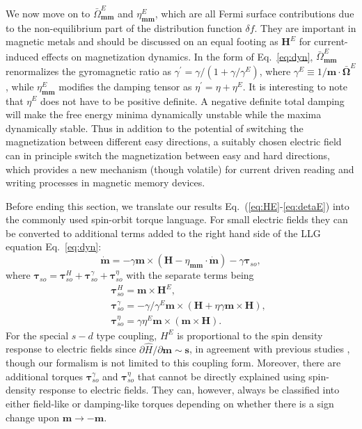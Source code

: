 \documentclass[aps,prb,twocolumn,showpacs,superscriptaddress]{revtex4-1}
\def\be{\begin{equation}} \def\ee{\end{equation}}
\begin{document}
We now move on to $\bar{\Omega}_{\bm m \bm m}^E$ and $\eta_{\bm m\bm m}^E$, which are all Fermi surface contributions due to the non-equilibrium part of the distribution function $\delta f$. They are important in magnetic metals and should be discussed on an equal footing as $\bm{H}^E$ for current-induced effects on magnetization dynamics. In the form of Eq.~\ref{eq:dyn}, $\bar{\Omega}_{\bm m \bm m}^E$ renormalizes the gyromagnetic ratio as $\gamma^{\prime} = \gamma/(1+\gamma/\gamma^E)$, where $\gamma^E \equiv 1/\bm m \cdot \bar{\bm \Omega}^E$, while $\eta_{\bm m\bm m}^E$ modifies the damping tensor as $\eta^\prime = \eta + \eta^E$. It is interesting to note that $\eta^E$ does not have to be positive definite. A negative definite total damping will make the free energy minima dynamically unstable while the maxima dynamically stable. Thus in addition to the potential of switching the magnetization between different easy directions, a suitably chosen electric field can in principle switch the magnetization between easy and hard directions, which provides a new mechanism (though volatile) for current driven reading and writing processes in magnetic memory devices.

Before ending this section, we translate our results Eq.~(\ref{eq:HE}-\ref{eq:detaE}) into the commonly used spin-orbit torque language. For small electric fields they can be converted to additional terms added to the right hand side of the LLG equation Eq.~\ref{eq:dyn}:
\be
\dot{\bm{m}} = - \gamma \bm{m}\times \left({\bm{H} - \eta_{\bm{m}\bm{m}} \cdot \dot{\bm{m}}}\right) - \gamma \bm{\tau}_{so}, \label{eq:dynnew}
\ee 
where $\bm{\tau}_{so} = \bm{\tau}_{so}^H +\bm{\tau}_{so}^\gamma +\bm{\tau}_{so}^\eta $ with the separate terms being
\begin{eqnarray}
&&\bm{\tau}_{so}^{H}=  \bm{m} \times \bm{H}^E,\label{eq:taoH}\\
&&\bm{\tau}_{so}^{\gamma}=-\gamma/\gamma^E\bm{m} \times (\bm{H}+\eta\gamma \bm{m}\times \bm{H}),\label{eq:taogamma}\\
&&\bm{\tau}_{so}^{\eta}=\gamma \eta^E \bm{m}\times(\bm{m}\times \bm{H}).\label{eq:taoeta}
\end{eqnarray}
For the special $s-d$ type coupling, $H^E$ is proportional to the spin density response to electric fields since $\partial \hat{H} /\partial \bm{m} \sim \bm{s}$, in agreement with previous studies \cite{edelstein:1990spin, Mellnik:2014spin, garate:2009aa,Freimuth:2014}, though our formalism is not limited to this coupling form. Moreover, there are additional torques $\bm{\tau}_{so}^{\gamma}$ and $\bm{\tau}_{so}^{\eta}$ that cannot be directly explained using spin-density response to electric fields. They can, however, always be classified into either field-like or damping-like torques depending on whether there is a sign change upon $\bm m\rightarrow -\bm m$.
 
\end{document}
